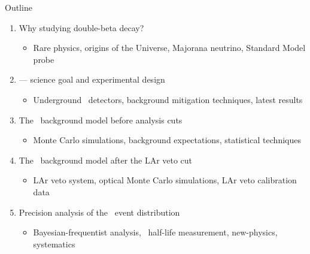 \documentclass[10pt,aspectratio=169]{beamer}
\begin{document}
\begin{frame}{Outline}
  \begin{enumerate}
    \item Why studying \alert{double-beta} decay?
      \begin{itemize}
        \item Rare physics, origins of the Universe, Majorana neutrino, Standard Model probe
      \end{itemize}
    \item \alert{\gerda} --- science goal and experimental design
      \begin{itemize}
        \item Underground \gesix\ detectors, background mitigation techniques, latest results
      \end{itemize}
    \item The \gerda\ \alert{background model} before analysis cuts
      \begin{itemize}
        \item Monte Carlo simulations, background expectations, statistical techniques
      \end{itemize}
    \item The \gerda\ background model \alert{after the LAr veto cut}
      \begin{itemize}
        \item LAr veto system, optical Monte Carlo simulations, LAr veto calibration data
      \end{itemize}
    \item Precision analysis of the \alert{\nnbb\ event distribution}
    \begin{itemize}
      \item Bayesian-frequentist analysis, \nnbb\ half-life measurement, new-physics, systematics
    \end{itemize}
  \end{enumerate}
\end{frame}
\end{document}
